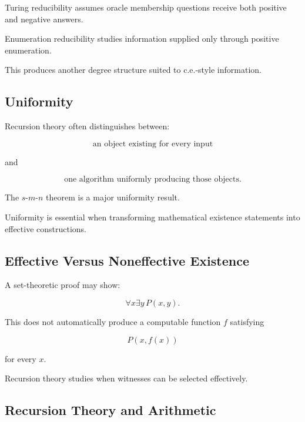 Turing reducibility assumes oracle membership questions receive both
positive and negative answers.

Enumeration reducibility studies information supplied only through positive
enumeration.

This produces another degree structure suited to c.e.-style information.

\subsection{Uniformity}
\label{subsec:recursion-theory-uniformity}

Recursion theory often distinguishes between:

\[
\boxed{
\text{an object existing for every input}
}
\]

and

\[
\boxed{
\text{one algorithm uniformly producing those objects}.
}
\]

The \(s\)-\(m\)-\(n\) theorem is a major uniformity result.

Uniformity is essential when transforming mathematical existence statements
into effective constructions.

\subsection{Effective Versus Noneffective Existence}
\label{subsec:effective-noneffective-existence}

A set-theoretic proof may show:

\[
\boxed{
\forall x\exists y\,P(x,y).
}
\]

This does not automatically produce a computable function \(f\) satisfying

\[
\boxed{
P(x,f(x))
}
\]

for every \(x\).

Recursion theory studies when witnesses can be selected effectively.

\subsection{Recursion Theory and Arithmetic}
\label{subsec:recursion-theory-arithmetic}

